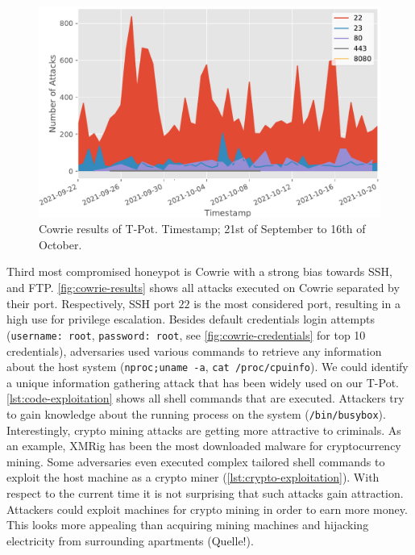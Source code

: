 \begin{figure}[ht]
    \centering
    \includegraphics[width=\textwidth]{figures/tpot-cowrie-port.pdf}
    \caption[Cowrie results of T-Pot]{Cowrie results of T-Pot. Timestamp; 21st of September to 16th of October.}
    \label{fig:cowrie-results}
\end{figure}

Third most compromised honeypot is Cowrie with a strong bias towards SSH, and FTP.
\autoref{fig:cowrie-results} shows all attacks executed on Cowrie separated by their port.
Respectively, SSH port $22$ is the most considered port, resulting in a high use for privilege escalation.
Besides default credentials login attempts (\verb|username: root|, \verb|password: root|, see \autoref{fig:cowrie-credentials} for top 10 credentials), adversaries used various commands to retrieve any information about the host system (\verb|nproc;uname -a|, \verb|cat /proc/cpuinfo|).
We could identify a unique information gathering attack that has been widely used on our T-Pot.
\autoref{lst:code-exploitation} shows all shell commands that are executed.
Attackers try to gain knowledge about the running process on the system (\verb|/bin/busybox|).
Interestingly, crypto mining attacks are getting more attractive to criminals.
As an example, XMRig has been the most downloaded malware for cryptocurrency mining.
Some adversaries even executed complex tailored shell commands to exploit the host machine as a crypto miner (\autoref{lst:crypto-exploitation}).
With respect to the current time it is not surprising that such attacks gain attraction.
Attackers could exploit machines for crypto mining in order to earn more money.
This looks more appealing than acquiring mining machines and hijacking electricity from surrounding apartments (Quelle!).

